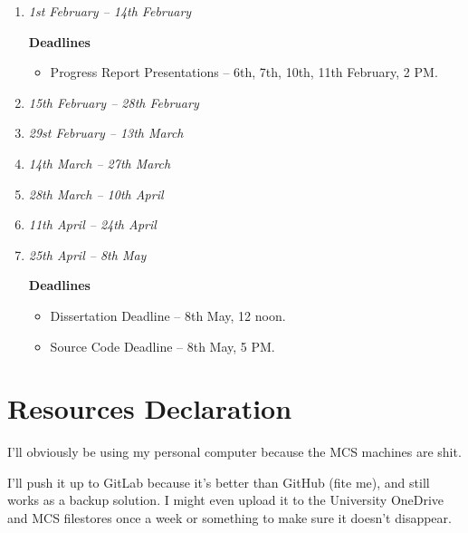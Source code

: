 \documentclass[a4paper,12pt]{article}
\begin{document}
\begin{enumerate}[label=\textbf{Slot \arabic*} -,start = 0]
 \item 
 \emph{1st February -- 14th February}
 
 \textbf{Deadlines}
 \begin{itemize}
  \item 
  Progress Report Presentations -- 6th, 7th, 10th, 11th February, 2 PM.
 \end{itemize}
 
 \item 
 \emph{15th February -- 28th February}
 
 \item 
 \emph{29st February -- 13th March}
 
 \item 
 \emph{14th March -- 27th March}
 
 \item 
 \emph{28th March -- 10th April}
 
 \item 
 \emph{11th April -- 24th April}
 
 \item 
 \emph{25th April -- 8th May}
 
 \textbf{Deadlines}
 \begin{itemize}
  \item 
  Dissertation Deadline -- 8th May, 12 noon.
  \item
  Source Code Deadline -- 8th May, 5 PM.
 \end{itemize}
\end{enumerate}

\section{Resources Declaration}

I'll obviously be using my personal computer because the MCS machines are shit.

I'll push it up to GitLab because it's better than GitHub (fite me), and still works as a backup solution. I might even upload it to the University OneDrive and MCS filestores once a week or something to make sure it doesn't disappear.
\end{document}
